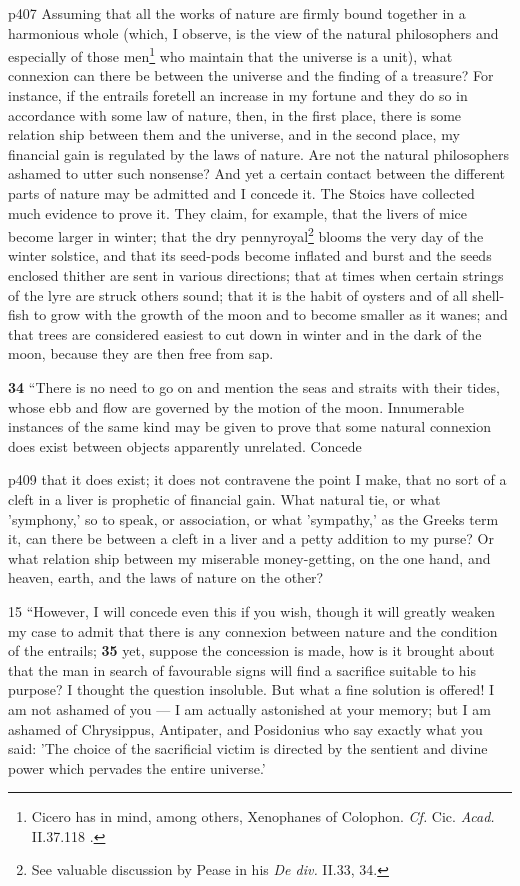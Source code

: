 p407 Assuming that all the works of nature are firmly bound together in a harmonious whole (which, I observe, is the view of the natural philosophers and especially of those men\texthebrew{}\footnote{Cicero has in mind, among others, Xenophanes of Colophon. \emph{Cf.} Cic. \emph{Acad.} II.37.118 .

} who maintain that the universe is a unit), what connexion can there be between the universe and the finding of a treasure? For instance, if the entrails foretell an increase in my fortune and they do so in accordance with some law of nature, then, in the first place, there is some relation ­ship between them and the universe, and in the second place, my financial gain is regulated by the laws of nature. Are not the natural philosophers ashamed to utter such nonsense? And yet a certain contact between the different parts of nature may be admitted and I concede it. The Stoics have collected much evidence to prove it. They claim, for example, that the livers of mice become larger in winter; that the dry pennyroyal\texthebrew{}\footnote{See valuable discussion by Pease in his \emph{De div.} II.33, 34.

} blooms the very day of the winter solstice, and that its seed-pods become inflated and burst and the seeds enclosed thither are sent in various directions; that at times when certain strings of the lyre are struck others sound; that it is the habit of oysters and of all shell-fish to grow with the growth of the moon and to become smaller as it wanes; and that trees are considered easiest to cut down in winter and in the dark of the moon, because they are then free from sap.

\textbf{34} ``There is no need to go on and mention the seas and straits with their tides, whose ebb and flow are governed by the motion of the moon. Innumerable instances of the same kind may be given to prove that some natural connexion does exist between objects apparently unrelated. Concede

p409 that it does exist; it does not contravene the point I make, that no sort of a cleft in a liver is prophetic of financial gain. What natural tie, or what 'symphony,' so to speak, or association, or what 'sympathy,' as the Greeks term it, can there be between a cleft in a liver and a petty addition to my purse? Or what relation ­ship between my miserable money-getting, on the one hand, and heaven, earth, and the laws of nature on the other?

15
``However, I will concede even this if you wish, though it will greatly weaken my case to admit that there is any connexion between nature and the condition of the entrails; \textbf{35} yet, suppose the concession is made, how is it brought about that the man in search of favourable signs will find a sacrifice suitable to his purpose? I thought the question insoluble. But what a fine solution is offered! I am not ashamed of you \texthebrew{—} I am actually astonished at your memory; but I am ashamed of Chrysippus, Antipater, and Posidonius who say exactly what you said: 'The choice of the sacrificial victim is directed by the sentient and divine power which pervades the entire universe.'

